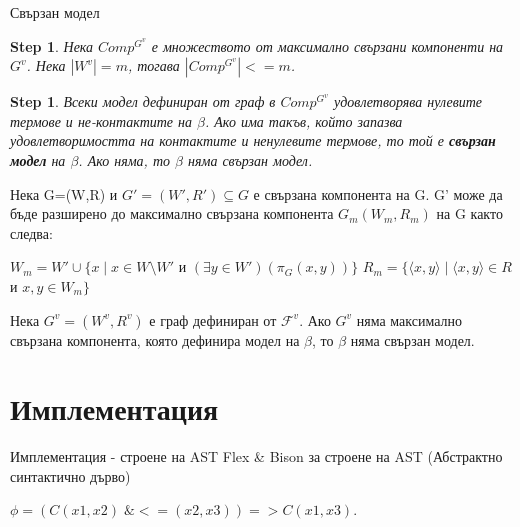 \documentclass[14pt, aspectratio=169]{beamer}
\newtheorem{step}[theorem]{Step}
\newcommand\F{\mathcal{F}}
\newcommand{\pair}[2]{ \langle #1, #2 \rangle }
\newcommand{\pairXY}{ \pair{x}{y} }
\begin{document}
\begin{frame}{Свързан модел}
	\begin{step}
		Нека $Comp^{G^v}$ е множеството от максимално свързани компоненти на $G^v$. Нека $|W^v|=m$, тогава $|Comp^{G^v}| <= m$.
	\end{step}

	\begin{step}
		Всеки модел дефиниран от граф в $Comp^{G^v}$ удовлетворява нулевите термове и не-контактите на $\beta$.  Ако има такъв, който запазва удовлетворимостта на контактите и ненулевите термове, то той е \textbf{свързан модел} на $\beta$. Ако няма, то $\beta$ няма свързан модел.
	\end{step}
\end{frame}

\begin{frame}
	\begin{lemma}
		Нека G=(W,R) и $G'=(W', R') \subseteq G$ е свързана компонента на G.
		G' може да бъде разширено до максимално свързана компонента $G_m(W_m, R_m)$  на G  както следва:
		\begin{center}
			 $W_m = W' \cup \{ x \mid x \in W \setminus W'$ и $(\exists y \in W')(\pi_G(x,y)) \}$
			 $R_m = \{ \pairXY \mid \pairXY \in R$ и $x, y \in W_m \}$
		\end{center}
	\end{lemma}

	\begin{theorem}
		Нека $G^v=(W^v, R^v)$ е граф дефиниран от $\F^v$. Ако $G^v$ няма максимално свързана компонента, която дефинира модел на $\beta$, то $\beta$ няма свързан модел.
	\end{theorem}
\end{frame}

\section{Имплементация}

\begin{frame}{Имплементация - строене на AST}
	Flex \& Bison за строене на AST (Абстрактно синтактично дърво)
		\begin{example}
		\begin{center}
		$\phi = (C(x1,x2) \;\& <=(x2, x3)) => C(x1, x3)$.
		\end{center}
	\end{example}
\end{frame}
\end{document}
